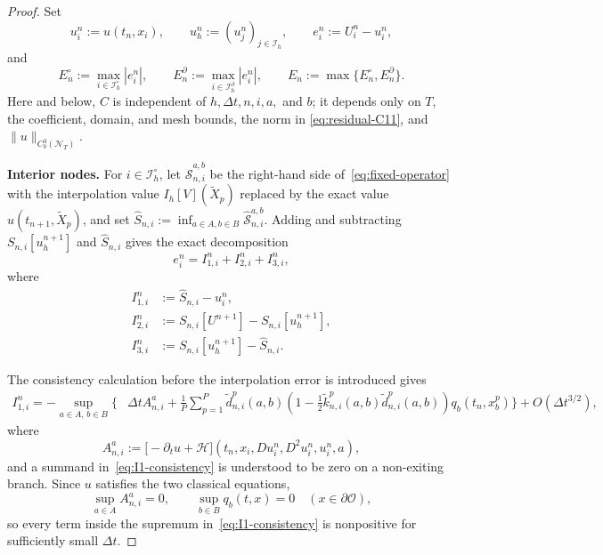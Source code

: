 \documentclass[10pt,a4paper]{amsart}
\newcommand{\cO}{\mathcal{O}}
\newcommand{\cS}{\mathcal{S}}
\newcommand{\dt}{\Delta t}
\begin{document}
	\begin{proof}
		Set
		\[
		u_i^n:=u(t_n,x_i),\qquad
		u_h^n:=(u_j^n)_{j\in\mathcal I_h},\qquad
		e_i^n:=U_i^n-u_i^n,
		\]
		and
		\[
		E_n^\circ:=\max_{i\in\mathcal I_h^\circ}|e_i^n|,\qquad
		E_n^\partial:=\max_{i\in\mathcal I_h^\partial}|e_i^n|,\qquad
		E_n:=\max\{E_n^\circ,E_n^\partial\}.
		\]
		Here and below, $C$ is independent of $h,\dt,n,i,a,$ and $b$; it depends
		only on $T$, the coefficient, domain, and mesh bounds, the norm in
		\eqref{eq:residual-C11}, and $\|u\|_{C_b^3(\mathcal N_T)}$.
		
		\medskip
		\noindent\textbf{Interior nodes.}
		For $i\in\mathcal I_h^\circ$, let $\widehat{\cS}_{n,i}^{a,b}$ be the
		right-hand side of~\eqref{eq:fixed-operator} with the interpolation value
		$I_h[V](\widetilde X_p)$ replaced by the exact value
		$u(t_{n+1},\widetilde X_p)$, and set
		$\widehat S_{n,i}:=\inf_{a\in A,b\in B}\widehat{\cS}_{n,i}^{a,b}$.
		Adding and subtracting $S_{n,i}[u_h^{n+1}]$ and $\widehat S_{n,i}$ gives
		the exact decomposition
		\begin{equation}
			e_i^n=I_{1,i}^n+I_{2,i}^n+I_{3,i}^n,
			\label{eq:three-error-parts}
		\end{equation}
		where
		\begin{align*}
			I_{1,i}^n&:=\widehat S_{n,i}-u_i^n,\\
			I_{2,i}^n&:=S_{n,i}[U^{n+1}]-S_{n,i}[u_h^{n+1}],\\
			I_{3,i}^n&:=S_{n,i}[u_h^{n+1}]-\widehat S_{n,i}.
		\end{align*}
		
		The consistency calculation before the interpolation error is introduced
		gives
		\begin{align}
			I_{1,i}^n
			=-\sup_{a\in A,\,b\in B}\Biggl\{&
			\dt A_{n,i}^a
			+\frac1P\sum_{p=1}^P\widetilde d_{n,i}^p(a,b)
			\left(1-\frac12\widetilde k_{n,i}^p(a,b)
			\widetilde d_{n,i}^p(a,b)\right)
			q_b(t_n,x_b^p)\Biggr\}
			+O(\dt^{3/2}),
			\label{eq:I1-consistency}
		\end{align}
		where
		\[
		A_{n,i}^a:=
		\bigl[-\partial_tu+\mathcal H\bigr]
		(t_n,x_i,Du_i^n,D^2u_i^n,u_i^n,a),
		\]
		and a summand in~\eqref{eq:I1-consistency} is understood to be zero on a
		non-exiting branch.  Since $u$ satisfies the two classical equations,
		\[
		\sup_{a\in A}A_{n,i}^a=0,
		\qquad \sup_{b\in B}q_b(t,x)=0
		\quad (x\in\partial\cO),
		\]
		so every term inside the supremum in~\eqref{eq:I1-consistency} is
		nonpositive for sufficiently small $\dt$.
		

\end{proof}
\end{document}
